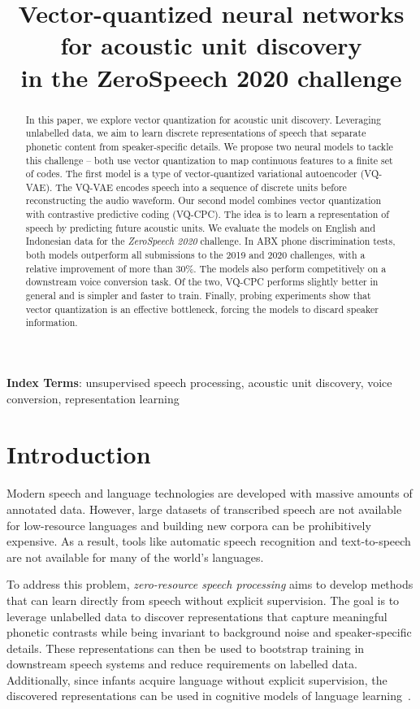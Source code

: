 \documentclass[a4paper]{article}
\title{Vector-quantized neural networks for acoustic unit discovery \\ in the ZeroSpeech 2020 challenge}
\begin{document}
\maketitle

\begin{abstract}
In this paper, we explore vector quantization for acoustic unit discovery. Leveraging unlabelled data, we aim to learn discrete representations of speech that separate phonetic content from speaker-specific details. 
We propose two neural models to tackle this challenge -- both use vector quantization to map continuous features to a finite set of codes.
The first model is a type of vector-quantized variational autoencoder (VQ-VAE). 
The VQ-VAE encodes speech into a sequence of discrete units before reconstructing the audio waveform.
Our second model combines vector quantization with contrastive predictive coding (VQ-CPC). 
The idea is to learn a representation of speech by predicting future acoustic units.
We evaluate the models on English and Indonesian data for the \textit{ZeroSpeech 2020} challenge. 
In ABX phone discrimination tests, both models outperform all submissions to the 2019 and 2020 challenges, with a relative improvement of more than 30\%. 
The models also perform competitively on a downstream voice conversion task. 
Of the two, VQ-CPC performs slightly better in general and is simpler and faster to train. 
Finally, probing experiments show that vector quantization is an effective bottleneck, forcing the models to discard speaker information.
\end{abstract}
\noindent\textbf{Index Terms}: unsupervised speech processing, acoustic unit discovery, voice conversion, representation learning
 \section{Introduction}

Modern speech and language technologies are developed with massive
amounts of annotated data. 
However, large datasets of transcribed speech are not available for {low-resource} languages and building new corpora can be prohibitively expensive.
As a result, tools like automatic speech recognition and text-to-speech are not available for many of the world's languages.

To address this problem, \textit{zero-resource speech processing} aims to develop methods that can learn directly from speech without explicit supervision. 
The goal is to leverage unlabelled data to discover representations that capture meaningful phonetic contrasts while being invariant to background noise and speaker-specific details.
These representations can then be used to bootstrap training in downstream speech systems and reduce requirements on labelled data. 
Additionally, since infants acquire language without explicit supervision, the discovered representations can be used in cognitive models of language learning~\cite{rasanen_speechcom12,schatz+feldman_ccn18,shain+elsner_naacl19}.
\end{document}
